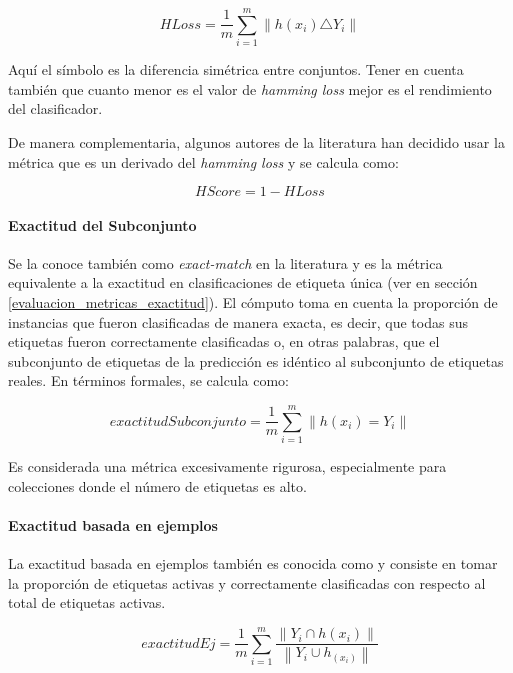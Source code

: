 \begin{equation}
	HLoss = \frac{1}{m} \sum_{i=1}^{m} \left\|h(x_{i}) \triangle Y_{i}\right\|
\end{equation}

Aquí el símbolo \comillas{$\triangle$} es la diferencia simétrica entre
conjuntos. Tener en cuenta también que cuanto menor es el valor de
\textit{hamming loss} mejor es el rendimiento del clasificador.

De manera complementaria, algunos autores de la literatura han decidido usar la
métrica  que es un derivado del \textit{hamming
	loss} y se calcula como:

\begin{equation}
	HScore = 1 - HLoss
\end{equation}

\paragraph{Exactitud del Subconjunto} Se la conoce también como
\textit{exact-match} en la literatura y es la métrica equivalente a la exactitud
en clasificaciones de etiqueta única (ver  en sección
\ref{evaluacion_metricas_exactitud}). El cómputo toma en cuenta la proporción de
instancias que fueron clasificadas de manera exacta, es decir, que todas sus
etiquetas fueron correctamente clasificadas o, en otras palabras, que el
subconjunto de etiquetas de la predicción es idéntico al subconjunto de
etiquetas reales. En términos formales, se calcula como:

\begin{equation}
	exactitudSubconjunto = \frac{1}{m} \sum_{i=1}^{m} \left\|h(x_{i}) =
	Y_{i}\right\|
\end{equation}

Es considerada una métrica excesivamente rigurosa, especialmente para
colecciones donde el número de etiquetas es alto.

\paragraph{Exactitud basada en ejemplos}

La exactitud basada en ejemplos también es conocida como  y consiste en tomar la proporción de etiquetas activas y correctamente
clasificadas con respecto al total de etiquetas activas.

\begin{equation}
	exactitudEj = \frac{1}{m} \sum_{i=1}^{m}
	\frac{\left\|Y_{i} \cap h(x_{i})\right\|}
	{\left\|Y_{i} \cup h_(x_{i})\right\|}
\end{equation}



